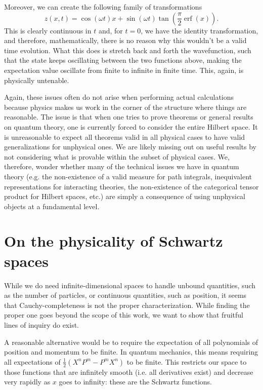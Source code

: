 \documentclass[10pt,twocolumn, nofootinbib]{revtex4-2}
\DeclareMathOperator{\erf}{erf}
\begin{document}
Moreover, we can create the following family of transformations
\begin{equation}
z(x, t) = \cos(\omega t) x + \sin(\omega t) \tan \left(\frac{\pi}{2}\erf(x)\right).
\end{equation}
This is clearly continuous in $t$ and, for $t=0$, we have the identity transformation, and therefore, mathematically, there is no reason why this wouldn't be a valid time evolution. What this does is stretch back and forth the wavefunction, such that the state keeps oscillating between the two functions above, making the expectation value oscillate from finite to infinite in finite time. This, again, is physically untenable.

Again, these issues often do not arise when performing actual calculations because physics makes us work in the corner of the structure where things are reasonable. The issue is that when one tries to prove theorems or general results on quantum theory, one is currently forced to consider the entire Hilbert space. It is unreasonable to expect all theorems valid in all physical cases to have valid generalizations for unphysical ones. We are likely missing out on useful results by not considering what is provable within the subset of physical cases. We, therefore, wonder whether many of the technical issues we have in quantum theory (e.g. the non-existence of a valid measure for path integrals\cite{glimm_quantum_1987}, inequivalent representations for interacting theories\cite{earman_haags_2006}, the non-existence of the categorical tensor product for Hilbert spaces\cite{garrett_tensor_2010, sorkin_inside_2022}, etc.)  are simply a consequence of using unphysical objects at a fundamental level.

\section{On the physicality of Schwartz spaces}

While we do need infinite-dimensional spaces to handle unbound quantities, such as the number of particles, or continuous quantities, such as position, it seems that Cauchy-completeness is not the proper characterization. While finding the proper one goes beyond the scope of this work, we want to show that fruitful lines of inquiry do exist.

A reasonable alternative would be to require the expectation of all polynomials of position and momentum to be finite. In quantum mechanics, this means requiring all expectations of $\frac{1}{2}(X^nP^m - P^mX^n)$ to be finite. This restricts our space to those functions that are infinitely smooth (i.e. all derivatives exist) and decrease very rapidly as $x$ goes to infinity: these are the Schwartz functions.
\end{document}

